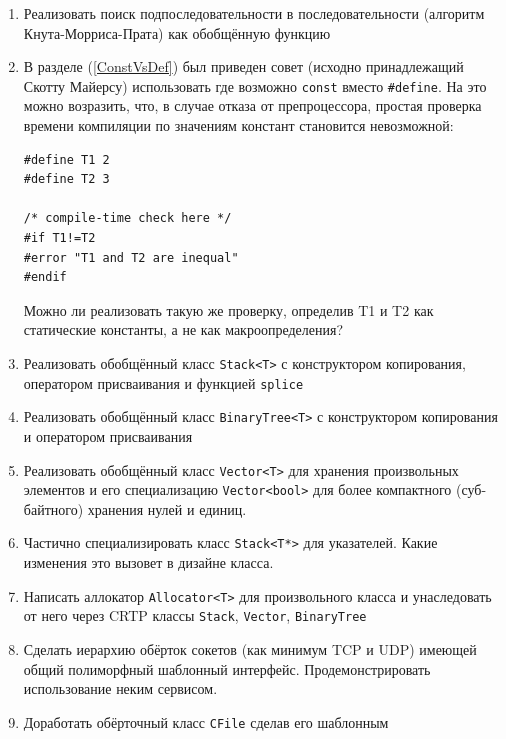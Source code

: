 \documentclass[a4paper,12pt,oneside]{article}
\begin{document}
\begin{enumerate}

\item
Реализовать поиск подпоследовательности в последовательности (алгоритм Кнута-Морриса-Прата) как обобщённую функцию

\item
В разделе (\ref{ConstVsDef}) был приведен совет (исходно принадлежащий Скотту Майерсу) использовать где возможно \lstinline!const! вместо \lstinline!#define!. На это можно возразить, что, в случае отказа от препроцессора, простая проверка времени компиляции по значениям констант становится невозможной:

\begin{lstlisting}
#define T1 2
#define T2 3

/* compile-time check here */
#if T1!=T2
#error "T1 and T2 are inequal"
#endif
\end{lstlisting}

Можно ли реализовать такую же проверку, определив T1 и T2 как статические константы, а не как макроопределения?

\item
Реализовать обобщённый класс \lstinline!Stack<T>! с конструктором копирования, оператором присваивания и функцией \lstinline!splice!

\item
Реализовать обобщённый класс \lstinline!BinaryTree<T>! с конструктором копирования и оператором присваивания

\item
Реализовать обобщённый класс \lstinline!Vector<T>! для хранения произвольных элементов и его специализацию \lstinline!Vector<bool>! для более компактного (суб-байтного) хранения нулей и единиц.

\item
Частично специализировать класс \lstinline!Stack<T*>! для указателей. Какие изменения это вызовет в дизайне класса.

\item
Написать аллокатор \lstinline!Allocator<T>! для произвольного класса и унаследовать от него через CRTP классы \lstinline!Stack!, \lstinline!Vector!, \lstinline!BinaryTree!

\item
Сделать иерархию обёрток сокетов (как минимум TCP и UDP) имеющей общий полиморфный шаблонный интерфейс. Продемонстрировать использование неким сервисом.

\item
Доработать обёрточный класс \lstinline!CFile! сделав его шаблонным


\end{enumerate}
\end{document}
